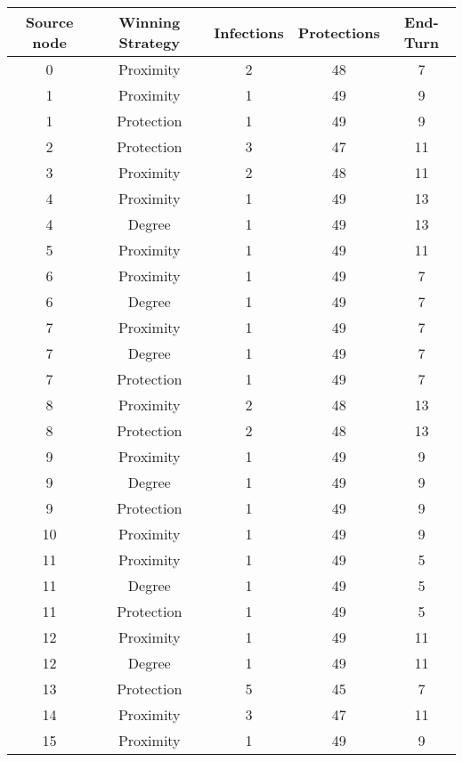 \documentclass[results.tex]{subfiles}
\begin{document}
\begin{center}
  \begin{tabular}{| c || c | c | c | c |}
    \hline
    {\bfseries Source node} & {\bfseries Winning Strategy} & {\bfseries Infections} & {\bfseries Protections} & {\bfseries End-Turn} \\  %
    \hline\hline
    0 & Proximity & 2 & 48 & 7 \\ 
    \hline
    1 & Proximity & 1 & 49 & 9 \\ 
    \hline
    1 & Protection & 1 & 49 & 9 \\ 
    \hline
    2 & Protection & 3 & 47 & 11 \\ 
    \hline
    3 & Proximity & 2 & 48 & 11 \\ 
    \hline
    4 & Proximity & 1 & 49 & 13 \\ 
    \hline
    4 & Degree & 1 & 49 & 13 \\ 
    \hline
    5 & Proximity & 1 & 49 & 11 \\ 
    \hline
    6 & Proximity & 1 & 49 & 7 \\ 
    \hline
    6 & Degree & 1 & 49 & 7 \\ 
    \hline
    7 & Proximity & 1 & 49 & 7 \\ 
    \hline
    7 & Degree & 1 & 49 & 7 \\ 
    \hline
    7 & Protection & 1 & 49 & 7 \\ 
    \hline
    8 & Proximity & 2 & 48 & 13 \\ 
    \hline
    8 & Protection & 2 & 48 & 13 \\ 
    \hline
    9 & Proximity & 1 & 49 & 9 \\ 
    \hline
    9 & Degree & 1 & 49 & 9 \\ 
    \hline
    9 & Protection & 1 & 49 & 9 \\ 
    \hline
    10 & Proximity & 1 & 49 & 9 \\ 
    \hline
    11 & Proximity & 1 & 49 & 5 \\ 
    \hline
    11 & Degree & 1 & 49 & 5 \\ 
    \hline
    11 & Protection & 1 & 49 & 5 \\ 
    \hline
    12 & Proximity & 1 & 49 & 11 \\ 
    \hline
    12 & Degree & 1 & 49 & 11 \\ 
    \hline
    13 & Protection & 5 & 45 & 7 \\ 
    \hline
    14 & Proximity & 3 & 47 & 11 \\ 
    \hline
    15 & Proximity & 1 & 49 & 9 \\ 

\end{tabular}
\end{center}
\end{document}

